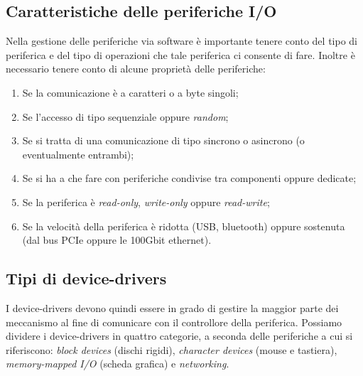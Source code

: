 \subsection{Caratteristiche delle periferiche I/O} 
Nella gestione delle periferiche via software è importante tenere conto del tipo di periferica e del tipo di operazioni che tale periferica ci consente di fare. Inoltre è necessario tenere conto di alcune proprietà delle periferiche:
\vspace{-5px}
\begin{enumerate}
\setlength{\itemsep}{-.15 em}
    \item Se la comunicazione è a caratteri o a byte singoli;
    \item Se l'accesso di tipo sequenziale oppure \textit{random};
    \item Se si tratta di una comunicazione di tipo sincrono o asincrono (o eventualmente entrambi);
    \item Se si ha a che fare con periferiche condivise tra componenti oppure dedicate;
    \item Se la periferica è \textit{read-only}, \textit{write-only} oppure \textit{read-write};
    \item Se la velocità della periferica è ridotta (USB, bluetooth) oppure sostenuta (dal bus PCIe oppure le 100Gbit ethernet).
\end{enumerate}

% 
\subsection{Tipi di device-drivers}
I device-drivers devono quindi essere in grado di gestire la maggior parte dei meccanismo al fine di comunicare con il controllore della periferica. Possiamo dividere i device-drivers in quattro categorie, a seconda delle periferiche a cui si riferiscono: \textit{block devices} (dischi rigidi), \textit{character devices} (mouse e tastiera), \textit{memory-mapped I/O} (scheda grafica) e \textit{networking}.

